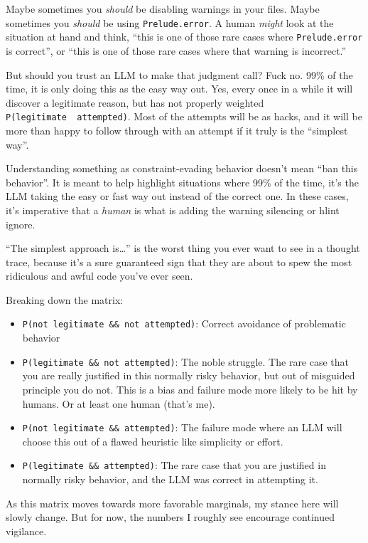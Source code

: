 \documentclass[]{article}
\begin{document}
Maybe sometimes you \emph{should} be disabling warnings in your files. Maybe
sometimes you \emph{should} be using \texttt{Prelude.error}. A human
\emph{might} look at the situation at hand and think, ``this is one of those
rare cases where \texttt{Prelude.error} is correct'', or ``this is one of those
rare cases where that warning is incorrect.''

But should you trust an LLM to make that judgment call? Fuck no. 99\% of the
time, it is only doing this as the easy way out. Yes, every once in a while it
will discover a legitimate reason, but has not properly weighted
\texttt{P(legitimate\ \textbar{}\ attempted)}. Most of the attempts will be as
hacks, and it will be more than happy to follow through with an attempt if it
truly is the {``simplest way''}.

Understanding something as constraint-evading behavior doesn't mean ``ban this
behavior''. It is meant to help highlight situations where 99\% of the time,
it's the LLM taking the easy or fast way out instead of the correct one. In
these cases, it's imperative that a \emph{human} is what is adding the warning
silencing or hlint ignore.

{``The simplest approach is\ldots{}''} is the worst thing you ever want to see
in a thought trace, because it's a sure guaranteed sign that they are about to
spew the most ridiculous and awful code you've ever seen.

Breaking down the matrix:

\begin{itemize}
\tightlist
\item
  \texttt{P(not\ legitimate\ \&\&\ not\ attempted)}: Correct avoidance of
  problematic behavior
\item
  \texttt{P(legitimate\ \&\&\ not\ attempted)}: The noble struggle. The rare
  case that you are really justified in this normally risky behavior, but out of
  misguided principle you do not. This is a bias and failure mode more likely to
  be hit by humans. Or at least one human (that's me).
\item
  \texttt{P(not\ legitimate\ \&\&\ attempted)}: The failure mode where an LLM
  will choose this out of a flawed heuristic like simplicity or effort.
\item
  \texttt{P(legitimate\ \&\&\ attempted)}: The rare case that you are justified
  in normally risky behavior, and the LLM was correct in attempting it.
\end{itemize}

As this matrix moves towards more favorable marginals, my stance here will
slowly change. But for now, the numbers I roughly see encourage continued
vigilance.
\end{document}
